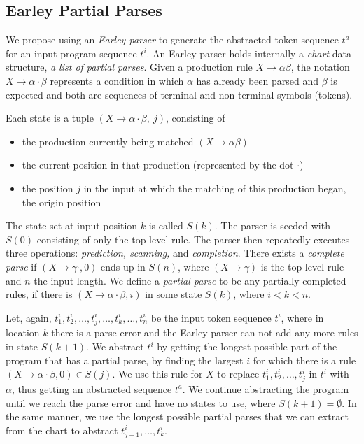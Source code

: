 \subsection{Earley Partial Parses}
\label{sec:prog-abstract:partial}

We propose using an \emph{Earley parser} to generate the abstracted token
sequence $t^a$ for an input program sequence $t^i$. An Earley parser holds
internally a \emph{chart} data structure, \ie \emph{a list of partial parses}.
Given a production rule $X \rightarrow \alpha \beta$, the notation $X
\rightarrow \alpha \cdot \beta$ represents a condition in which $\alpha$ has
already been parsed and $\beta$ is expected and both are sequences of terminal
and non-terminal symbols (tokens).

Each state is a tuple $(X \rightarrow \alpha \cdot \beta,\ j)$, consisting of
\begin{itemize}
    \item the production currently being matched $(X \rightarrow \alpha \beta)$
    \item the current position in that production (represented by the dot
    $\cdot$)
    \item the position $j$ in the input at which the matching of this production
    began, \ie the origin position
\end{itemize}

The state set at input position $k$ is called $S(k)$. The parser is seeded with
$S(0)$ consisting of only the top-level rule. The parser then repeatedly
executes three operations: \emph{prediction, scanning,} and \emph{completion}.
There exists a \emph{complete parse} if $(X \rightarrow \gamma \cdot, 0)$ ends
up in $S(n)$, where $(X \rightarrow \gamma)$ is the top level-rule and $n$ the
input length. We define a \emph{partial parse} to be any partially completed
rules, \ie if there is $(X \rightarrow \alpha \cdot \beta, i)$ in some state
$S(k)$, where $i < k < n$.

Let, again, $t^i_1, t^i_2, \dots, t^i_j, \dots, t^i_k, \dots, t^i_n$ be the
input token sequence $t^i$, where in location $k$ there is a parse error and the
Earley parser can not add any more rules in state $S(k + 1)$. We abstract $t^i$
by getting the longest possible part of the program that has a partial parse,
\ie by finding the largest $i$ for which there is a rule $(X \rightarrow \alpha
\cdot \beta, 0) \in S(j)$. We use this rule for $X$ to replace $t^i_1, t^i_2,
\dots, t^i_j$ in $t^i$ with $\alpha$, thus getting an abstracted sequence $t^a$.
We continue abstracting the program until we reach the parse error and have no
states to use, \ie where $S(k + 1) = \emptyset$. In the same manner, we use the
longest possible partial parses that we can extract from the chart to abstract
$t^i_{j+1}, \dots, t^i_k$.

